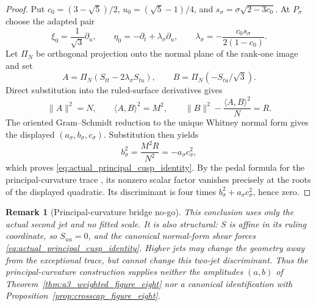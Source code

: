 \documentclass[11pt]{article}
\newtheorem{remark}[theorem]{Remark}
\begin{document}
\begin{proof}
Put $c_0=(3-\sqrt5)/2$, $u_0=(\sqrt5-1)/4$, and
$s_\sigma=\sigma\sqrt{2-3c_0}$.  At $P_\sigma$ choose the adapted pair
\[
 \xi_0=\frac1{\sqrt3}\partial_u,
 \qquad
 \eta_0=-\partial_t+\lambda_\sigma\partial_u,
 \qquad
 \lambda_\sigma=-\frac{c_0s_\sigma}{2(1-c_0)}.
\]
Let $\Pi_N$ be orthogonal projection onto the normal plane of the rank-one
image and set
\[
 A=\Pi_N(S_{tt}-2\lambda_\sigma S_{tu}),
 \qquad B=\Pi_N(-S_{tu}/\sqrt3).
\]
Direct substitution into the ruled-surface derivatives gives
\[
 \lVert A\rVert^2=N,\qquad
 \langle A,B\rangle^2=M^2,\qquad
 \lVert B\rVert^2-\frac{\langle A,B\rangle^2}{N}=R.
\]
The oriented Gram--Schmidt reduction to the unique Whitney normal form gives
the displayed $(a_\sigma,b_\sigma,c_\sigma)$.  Substitution then yields
\[
 b_\sigma^2=\frac{M^2R}{N^2}
 =-a_\sigma c_\sigma^2,
\]
which proves \eqref{eq:actual_principal_cusp_identity}.  By the pedal formula
for the principal-curvature trace \cite[Equation~(2.8)]{MartinsEtAl2026}, its
nonzero scalar factor vanishes precisely at the roots of the displayed
quadratic.  Its discriminant is four times
$b_\sigma^2+a_\sigma c_\sigma^2$, hence zero.
\end{proof}

\begin{remark}[Principal-curvature bridge no-go]
This conclusion uses only the actual second jet and no fitted scale.  It is
also structural: $S$ is affine in its ruling coordinate, so $S_{uu}=0$, and
the canonical normal-form shear forces
\eqref{eq:actual_principal_cusp_identity}.  Higher jets may change the
geometry away from the exceptional trace, but cannot change this two-jet
discriminant.  Thus the principal-curvature construction supplies neither the
amplitudes $(a,b)$ of Theorem~\ref{thm:a3_weighted_figure_eight} nor a canonical
identification with Proposition~\ref{prop:crosscap_figure_eight}.
\end{remark}
\end{document}
